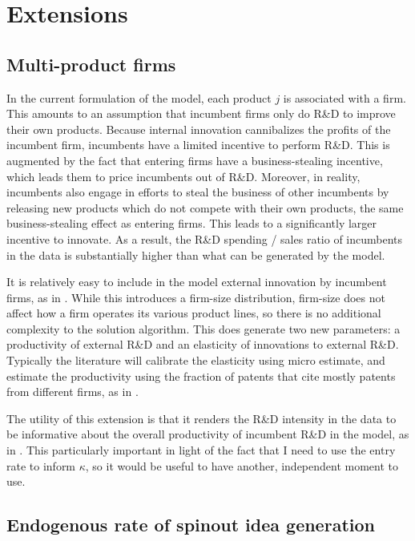 \documentclass[11pt,english]{article}
\theoremstyle{remark}
\begin{document}
\section{Extensions}\label{extensions}

\subsection{Multi-product firms}

In the current formulation of the model, each product $j$ is associated with a firm. This amounts to an assumption that incumbent firms only do R\&D to improve their own products. Because internal innovation cannibalizes the profits of the incumbent firm, incumbents have a limited incentive to perform R\&D. This is augmented by the fact that entering firms have a business-stealing incentive, which leads them to price incumbents out of R\&D. Moreover, in reality, incumbents also engage in efforts to steal the business of other incumbents by releasing new products which do not compete with their own products, the same business-stealing effect as entering firms. This leads to a significantly larger incentive to innovate. As a result, the R\&D spending / sales ratio of incumbents in the data is substantially higher than what can be generated by the model.

It is relatively easy to include in the model external innovation by incumbent firms, as in \cite{klette_innovating_2004}. While this introduces a firm-size distribution, firm-size does not affect how a firm operates its various product lines, so there is no additional complexity to the solution algorithm. This does generate two new parameters: a productivity of external R\&D and an elasticity of innovations to external R\&D. Typically the literature will calibrate the elasticity using micro estimate, and estimate the productivity using the fraction of patents that cite mostly patents from different firms, as in \cite{akcigit_growth_2018}.

The utility of this extension is that it renders the R\&D intensity in the data to be informative about the overall productivity of incumbent R\&D in the model, as in \cite{akcigit_growth_2018}. This particularly important in light of the fact that I need to use the entry rate to inform $\kappa$, so it would be useful to have another, independent moment to use.  

\subsection{Endogenous rate of spinout idea generation}
\end{document}

